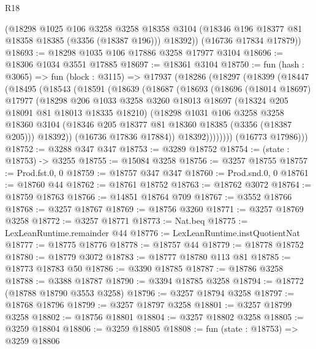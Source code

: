 \begin{lexlean}{R18}
\begin{coremodule}
        (@18298
          @1025
          @106
          @3258
          @3258
          @18358
          @3104
          (@18346 @196 @18377 @81 @18358 @18385 (@3356 (@18387 @196)))
          @18392))
      (@16736 @17834 @17879))
@18693 := @18298 @1035 @106 @17886 @3258 @17977 @3104
@18696 := @18306 @1034 @3551 @17885
@18697 := @18361 @3104
@18750 := fun (hash : @3065) =>
  fun (block : @3115) =>
  @17937
    (@18286
      (@18297
        (@18399
          (@18447
            (@18495
              (@18543
                (@18591
                  (@18639
                    (@18687
                      (@18693
                        (@18696
                          (@18014 @18697)
                          @17977
                          (@18298
                            @206
                            @1033
                            @3258
                            @3260
                            @18013
                            @18697
                            (@18324 @205 @18091 @81 @18013 @18335 @18210)
                            (@18298
                              @1031
                              @106
                              @3258
                              @3258
                              @18360
                              @3104
                              (@18346 @205 @18377 @81 @18360 @18385 (@3356 (@18387 @205)))
                              @18392))
                          (@16736 @17836 @17884))
                        @18392))))))))
        (@16773 @17986)))
@18752 := @3288 @347 @347
@18753 := @3289 @18752
@18754 := (state : @18753) -> @3255
@18755 := @15084 @3258
@18756 := @3257 @18755
@18757 := Prod.fst.{0, 0}
@18759 := @18757 @347 @347
@18760 := Prod.snd.{0, 0}
@18761 := @18760 @44
@18762 := @18761 @18752
@18763 := @18762 @3072
@18764 := @18759 @18763
@18766 := @14851 @18764 @709
@18767 := @3552 @18766
@18768 := @3257 @18767
@18769 := @18756 @3260
@18771 := @3257 @18769 @3258
@18772 := @3257 @18771
@18773 := Nat.beq
@18775 := LexLeanRuntime.remainder @44
@18776 := LexLeanRuntime.instQuotientNat
@18777 := @18775 @18776
@18778 := @18757 @44
@18779 := @18778 @18752
@18780 := @18779 @3072
@18783 := @18777 @18780 @113 @81
@18785 := @18773 @18783 @50
@18786 := @3390 @18785
@18787 := @18786 @3258
@18788 := @3388 @18787
@18790 := @3394 @18785 @3258
@18794 := @18772 (@18788 @18790 @3553 @3258)
@18796 := @3257 @18794 @3258
@18797 := @18768 @18796
@18799 := @3257 @18797 @3258
@18801 := @3257 @18799 @3258
@18802 := @18756 @18801
@18804 := @3257 @18802 @3258
@18805 := @3259 @18804
@18806 := @3259 @18805
@18808 := fun (state : @18753) => @3259 @18806

\end{coremodule}
\end{lexlean}
